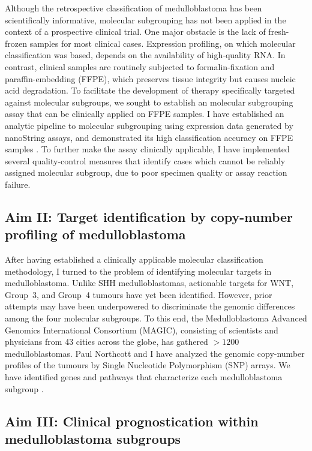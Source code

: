 \documentclass[11pt,letterpaper]{article}
\theoremstyle{definition}
\begin{document}
Although the retrospective classification of medulloblastoma has been scientifically informative, molecular subgrouping has not been applied in the context of a prospective clinical trial. One major obstacle is the lack of fresh-frozen samples for most clinical cases. Expression profiling, on which molecular classification was based, depends on the availability of high-quality RNA. In contrast, clinical samples are routinely subjected to formalin-fixation and paraffin-embedding (FFPE), which preserves tissue integrity but causes nucleic acid degradation. To facilitate the development of therapy specifically targeted against molecular subgroups, we sought to establish an molecular subgrouping assay that can be clinically applied on FFPE samples. I have established an analytic pipeline to molecular subgrouping using expression data generated by nanoString assays, and demonstrated its high classification accuracy on FFPE samples . To further make the assay clinically applicable, I have implemented several quality-control measures that identify cases which cannot be reliably assigned molecular subgroup, due to poor specimen quality or assay reaction failure.

\subsection{Aim II: Target identification by copy-number profiling of medulloblastoma}

After having established a clinically applicable molecular classification methodology, I turned to the problem of identifying molecular targets in medulloblastoma. Unlike SHH medulloblastomas, actionable targets for WNT, Group~3, and Group~4 tumours have yet been identified. However, prior attempts may have been underpowered to discriminate the genomic differences among the four molecular subgroups. To this end, the Medulloblastoma Advanced Genomics International Consortium (MAGIC), consisting of scientists and physicians from 43 cities across the globe, has gathered $>1200$ medulloblastomas. Paul Northcott and I have analyzed the genomic copy-number profiles of the tumours by Single Nucleotide Polymorphism (SNP) arrays. We have identified genes and pathways that characterize each medulloblastoma subgroup .

\subsection{Aim III: Clinical prognostication within medulloblastoma subgroups}
\end{document}
